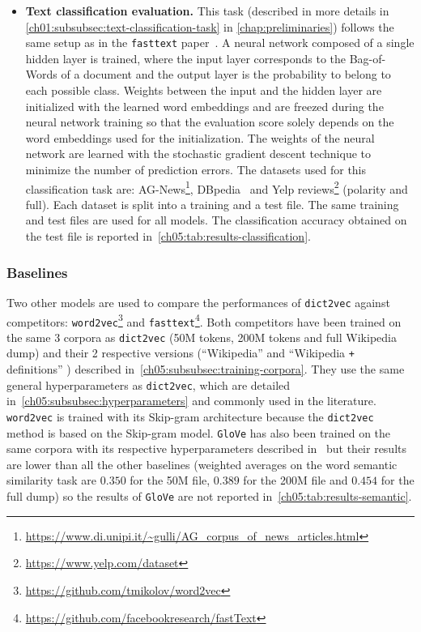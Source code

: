 \begin{itemize}
        \item \textbf{Text classification evaluation.} This task (described in
          more details in \autoref{ch01:subsubsec:text-classification-task} in
          \autoref{chap:preliminaries}) follows the same setup as in the
          \texttt{fasttext} paper~\citep{joulin2016bag}. A neural network
          composed of a single hidden layer is trained, where the input layer
          corresponds to the Bag-of-Words of a document and the output layer is
          the probability to belong to each possible class. Weights between the
          input and the hidden layer are initialized with the learned word
          embeddings and are freezed during the neural network training so that
          the evaluation score solely depends on the word embeddings used for
          the initialization. The weights of the neural network are learned with
          the stochastic gradient descent technique to minimize the number of
          prediction errors. The datasets used for this classification task are:
          AG-News\footnote{\url{https://www.di.unipi.it/~gulli/AG_corpus_of_news_articles.html}},
          DBpedia~\citep{auer2007dbpedia} and Yelp
          reviews\footnote{\url{https://www.yelp.com/dataset}} (polarity and
          full). Each dataset is split into a training and a test file. The
          same training and test files are used for all models. The
          classification accuracy obtained on the test file is reported
          in~\autoref{ch05:tab:results-classification}.
      \end{itemize}

    \subsubsection{Baselines}
      Two other models are used to compare the performances of \texttt{dict2vec}
      against competitors:
      \texttt{word2vec}\footnote{\url{https://github.com/tmikolov/word2vec}} and
      \texttt{fasttext}\footnote{\url{https://github.com/facebookresearch/fastText}}.
      Both competitors have been trained on the same 3 corpora as
      \texttt{dict2vec} (50M tokens, 200M tokens and full Wikipedia dump) and
      their 2 respective versions (``Wikipedia'' and ``Wikipedia \texttt{+}
      definitions'' ) described in~\autoref{ch05:subsubsec:training-corpora}.
      They use the same general hyperparameters as \texttt{dict2vec}, which are
      detailed in~\autoref{ch05:subsubsec:hyperparameters} and commonly used in
      the literature. \texttt{word2vec} is trained with its Skip-gram
      architecture because the \texttt{dict2vec} method is based on the
      Skip-gram model. \texttt{GloVe} has also been trained on the same corpora
      with its respective hyperparameters described
      in~\citep{pennington2014glove} but their results are lower than all the
      other baselines (weighted averages on the word semantic similarity task
      are $0.350$ for the 50M file, $0.389$ for the 200M file and $0.454$ for
      the full dump) so the results of \texttt{GloVe} are not reported
      in~\autoref{ch05:tab:results-semantic}.\medskip

